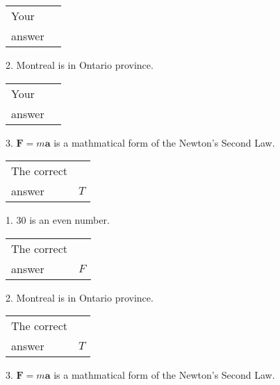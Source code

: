 \documentclass[12pt]{article}
\begin{document}
\noindent\begin{tabular}{|l|l|}\hline Your&\hspace{.2in} \\ answer&\hspace{.2in} \\ \hline \end{tabular}
2.  %
Montreal is in  %
Ontario province.
 
\noindent\begin{tabular}{|l|l|}\hline Your&\hspace{.2in} \\ answer&\hspace{.2in} \\ \hline \end{tabular}
3.  %
$\mathbf{F}=m\mathbf{a}$ is a mathmatical form of
the Newton's Second Law.
 
 
 
\noindent{}
 
 

 
\noindent\begin{tabular}{|l|l|}\hline The correct & \\
          answer &  %
$T$ \\ \hline \end{tabular}
1. $ %
30$ is an  %
even number.
 
\noindent\begin{tabular}{|l|l|}\hline The correct & \\
          answer &  %
$F$ \\ \hline \end{tabular}
2.  %
Montreal is in  %
Ontario province.
 
\noindent\begin{tabular}{|l|l|}\hline The correct & \\
          answer &  %
$T$ \\ \hline \end{tabular}
3.  %
$\mathbf{F}=m\mathbf{a}$ is a mathmatical form of  %
the Newton's Second Law.
 
 
 
\noindent{}
 
 

 
\vspace{0.3in}
   
   
   
\end{document}

